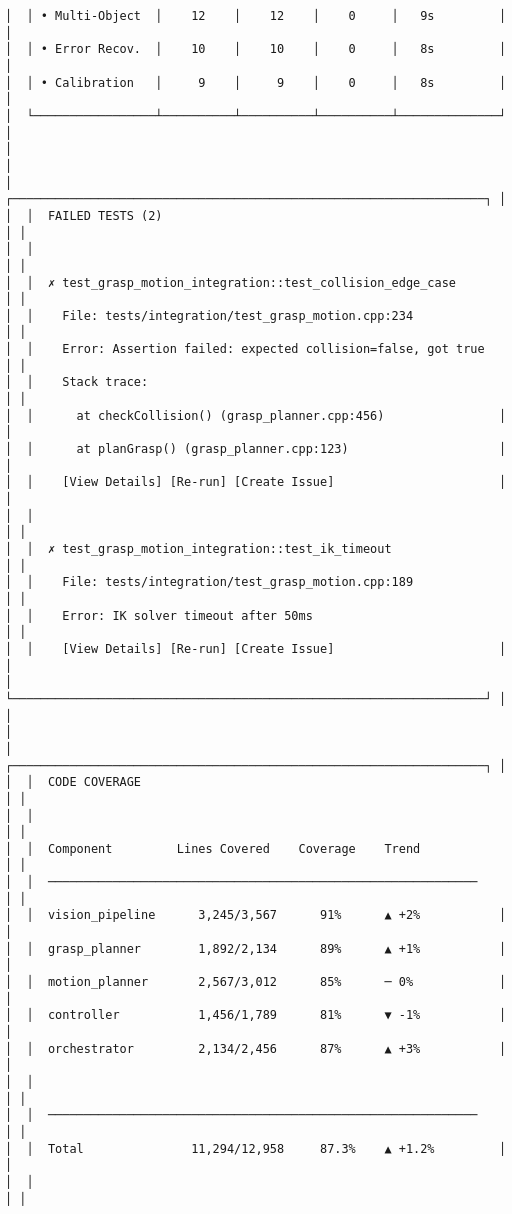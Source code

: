 \documentclass[
]{article}
\begin{document}
\begin{verbatim}
│  │ • Multi-Object  │    12    │    12    │    0     │   9s         │ │
│  │ • Error Recov.  │    10    │    10    │    0     │   8s         │ │
│  │ • Calibration   │     9    │     9    │    0     │   8s         │ │
│  └─────────────────┴──────────┴──────────┴──────────┴──────────────┘ │
│                                                                        │
│  ┌──────────────────────────────────────────────────────────────────┐ │
│  │  FAILED TESTS (2)                                                │ │
│  │                                                                   │ │
│  │  ✗ test_grasp_motion_integration::test_collision_edge_case       │ │
│  │    File: tests/integration/test_grasp_motion.cpp:234             │ │
│  │    Error: Assertion failed: expected collision=false, got true   │ │
│  │    Stack trace:                                                  │ │
│  │      at checkCollision() (grasp_planner.cpp:456)                │ │
│  │      at planGrasp() (grasp_planner.cpp:123)                     │ │
│  │    [View Details] [Re-run] [Create Issue]                       │ │
│  │                                                                   │ │
│  │  ✗ test_grasp_motion_integration::test_ik_timeout                │ │
│  │    File: tests/integration/test_grasp_motion.cpp:189             │ │
│  │    Error: IK solver timeout after 50ms                           │ │
│  │    [View Details] [Re-run] [Create Issue]                       │ │
│  └──────────────────────────────────────────────────────────────────┘ │
│                                                                        │
│  ┌──────────────────────────────────────────────────────────────────┐ │
│  │  CODE COVERAGE                                                    │ │
│  │                                                                   │ │
│  │  Component         Lines Covered    Coverage    Trend            │ │
│  │  ────────────────────────────────────────────────────────────    │ │
│  │  vision_pipeline      3,245/3,567      91%      ▲ +2%           │ │
│  │  grasp_planner        1,892/2,134      89%      ▲ +1%           │ │
│  │  motion_planner       2,567/3,012      85%      ─ 0%            │ │
│  │  controller           1,456/1,789      81%      ▼ -1%           │ │
│  │  orchestrator         2,134/2,456      87%      ▲ +3%           │ │
│  │                                                                   │ │
│  │  ────────────────────────────────────────────────────────────    │ │
│  │  Total               11,294/12,958     87.3%    ▲ +1.2%         │ │
│  │                                                                   │ │

\end{verbatim}
\end{document}
